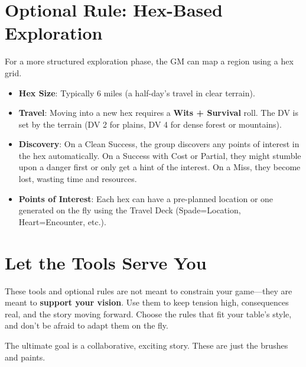 \section*{Optional Rule: Hex-Based Exploration}

For a more structured exploration phase, the GM can map a region using a hex grid.

\begin{itemize}
    \item \textbf{Hex Size}: Typically 6 miles (a half-day's travel in clear terrain).
    \item \textbf{Travel}: Moving into a new hex requires a \textbf{Wits + Survival} roll. The DV is set by the terrain (DV 2 for plains, DV 4 for dense forest or mountains).
    \item \textbf{Discovery}: On a Clean Success, the group discovers any points of interest in the hex automatically. On a Success with Cost or Partial, they might stumble upon a danger first or only get a hint of the interest. On a Miss, they become lost, wasting time and resources.
    \item \textbf{Points of Interest}: Each hex can have a pre-planned location or one generated on the fly using the Travel Deck (Spade=Location, Heart=Encounter, etc.).
\end{itemize}

\section*{Let the Tools Serve You}

These tools and optional rules are not meant to constrain your game---they are meant to \textbf{support your vision}. Use them to keep tension high, consequences real, and the story moving forward. Choose the rules that fit your table's style, and don't be afraid to adapt them on the fly.

The ultimate goal is a collaborative, exciting story. These are just the brushes and paints.